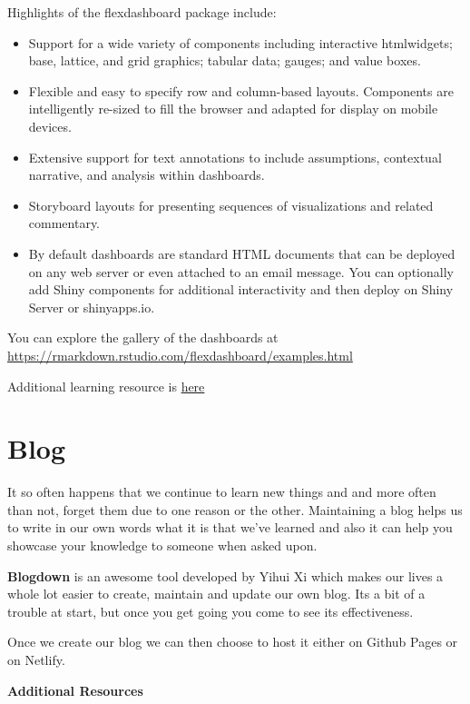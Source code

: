 \documentclass[]{book}
\theoremstyle{definition}
\theoremstyle{definition}
\theoremstyle{definition}
\theoremstyle{remark}
\begin{document}
Highlights of the flexdashboard package include:

\begin{itemize}
\item
  Support for a wide variety of components including interactive
  htmlwidgets; base, lattice, and grid graphics; tabular data; gauges;
  and value boxes.
\item
  Flexible and easy to specify row and column-based layouts. Components
  are intelligently re-sized to fill the browser and adapted for display
  on mobile devices.
\item
  Extensive support for text annotations to include assumptions,
  contextual narrative, and analysis within dashboards.
\item
  Storyboard layouts for presenting sequences of visualizations and
  related commentary.
\item
  By default dashboards are standard HTML documents that can be deployed
  on any web server or even attached to an email message. You can
  optionally add Shiny components for additional interactivity and then
  deploy on Shiny Server or shinyapps.io.
\end{itemize}

You can explore the gallery of the dashboards at
\url{https://rmarkdown.rstudio.com/flexdashboard/examples.html}

Additional learning resource is
\href{https://blog.rstudio.com/2016/05/17/flexdashboard-easy-interactive-dashboards-for-r/}{here}

\section{Blog}\label{blog}

It so often happens that we continue to learn new things and and more
often than not, forget them due to one reason or the other. Maintaining
a blog helps us to write in our own words what it is that we've learned
and also it can help you showcase your knowledge to someone when asked
upon.

\textbf{Blogdown} is an awesome tool developed by Yihui Xi which makes
our lives a whole lot easier to create, maintain and update our own
blog. Its a bit of a trouble at start, but once you get going you come
to see its effectiveness.

Once we create our blog we can then choose to host it either on Github
Pages or on Netlify.

\textbf{Additional Resources}
\end{document}
